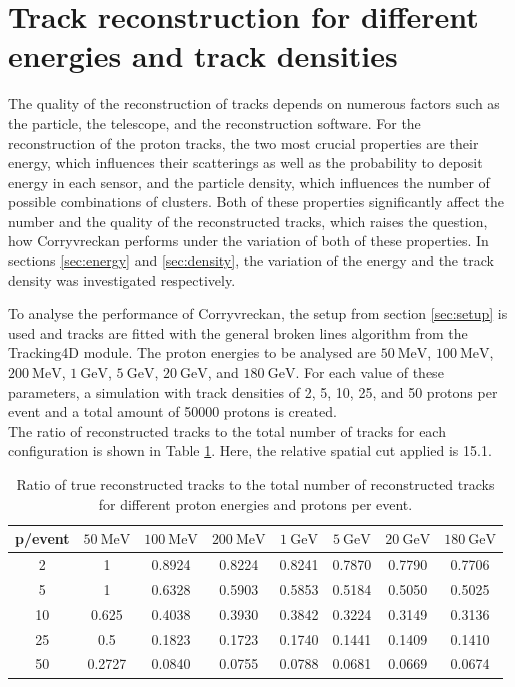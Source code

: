 \section{Track reconstruction for different energies and track densities}
The quality of the reconstruction of tracks depends on numerous factors such as the particle, the telescope, and the reconstruction software.
For the reconstruction of the proton tracks, the two most crucial properties are their energy, which influences their scatterings as well as the probability to deposit
energy in each sensor, and the particle density, which influences the number of possible combinations of clusters.
Both of these properties significantly affect the number and the quality of the reconstructed tracks, which raises the question, how Corryvreckan performs
under the variation of both of these properties.
In sections \ref{sec:energy} and \ref{sec:density}, the variation of the energy and the track density was investigated respectively.

To analyse the performance of Corryvreckan, the setup from section \ref{sec:setup} is used and tracks are fitted with the general broken lines algorithm
from the Tracking4D module.
The proton energies to be analysed are $\SI{50}{\mega\eV}$, $\SI{100}{\mega\eV}$, $\SI{200}{\mega\eV}$,
$\SI{1}{\giga\eV}$, $\SI{5}{\giga\eV}$, $\SI{20}{\giga\eV}$, and $\SI{180}{\giga\eV}$. For each value of these parameters, a simulation with track densities
of 2, 5, 10, 25, and 50 protons per event and a total amount of 50000 protons is created. \\
The ratio of reconstructed tracks to the total number of tracks for each configuration is shown in Table \ref{tab:study}. Here, the relative spatial cut applied is 15.1.


\begin{table}
  \centering
  \caption{Ratio of true reconstructed tracks to the total number of reconstructed tracks for different proton energies and protons per event.}
  \begin{tabular}{c | c c c c c c c}
    \toprule
     p/event &  $\SI{50}{\mega\eV}$ & $\SI{100}{\mega\eV}$ & $\SI{200}{\mega\eV}$ & $\SI{1}{\giga\eV}$ & $\SI{5}{\giga\eV}$ & $\SI{20}{\giga\eV}$ & $\SI{180}{\giga\eV}$ \\
    \midrule
     2   & 1 & 0.8924 & 0.8224 & 0.8241 & 0.7870 & 0.7790 & 0.7706  \\
     5   & 1 & 0.6328 & 0.5903 & 0.5853 & 0.5184 & 0.5050 & 0.5025  \\
     10  & 0.625 & 0.4038 & 0.3930 & 0.3842 & 0.3224 & 0.3149 & 0.3136  \\
     25  & 0.5 & 0.1823 & 0.1723 & 0.1740 & 0.1441 & 0.1409 & 0.1410  \\
     50  & 0.2727 & 0.0840 & 0.0755 & 0.0788 & 0.0681 & 0.0669 & 0.0674  \\
  \end{tabular}
  \label{tab:study}
\end{table}

